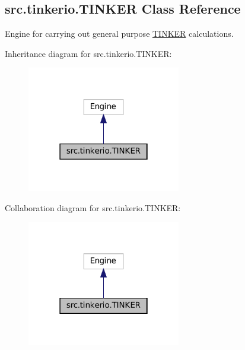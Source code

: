 \hypertarget{classsrc_1_1tinkerio_1_1TINKER}{}\subsection{src.\+tinkerio.\+T\+I\+N\+K\+ER Class Reference}
\label{classsrc_1_1tinkerio_1_1TINKER}


Engine for carrying out general purpose \hyperlink{classsrc_1_1tinkerio_1_1TINKER}{T\+I\+N\+K\+ER} calculations.  




Inheritance diagram for src.\+tinkerio.\+T\+I\+N\+K\+ER\+:
\nopagebreak
\begin{figure}[H]
\begin{center}
\leavevmode
\includegraphics[width=190pt]{classsrc_1_1tinkerio_1_1TINKER__inherit__graph}
\end{center}
\end{figure}


Collaboration diagram for src.\+tinkerio.\+T\+I\+N\+K\+ER\+:
\nopagebreak
\begin{figure}[H]
\begin{center}
\leavevmode
\includegraphics[width=190pt]{classsrc_1_1tinkerio_1_1TINKER__coll__graph}
\end{center}
\end{figure}

